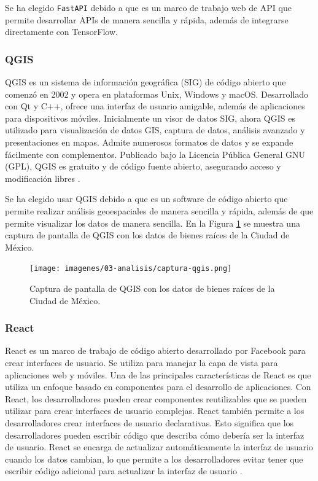 Se ha elegido \texttt{FastAPI} debido a que es un marco de trabajo web de API
que permite desarrollar APIs de manera sencilla y rápida, además de integrarse
directamente con TensorFlow.

\subsubsection{QGIS}
QGIS es un sistema de información geográfica (SIG) de código abierto que comenzó
en 2002 y opera en plataformas Unix, Windows y macOS. Desarrollado con Qt y C++,
ofrece una interfaz de usuario amigable, además de aplicaciones para dispositivos
móviles. Inicialmente un visor de datos SIG, ahora QGIS es utilizado para
visualización de datos GIS, captura de datos, análisis avanzado y presentaciones
en mapas. Admite numerosos formatos de datos y se expande fácilmente con complementos.
Publicado bajo la Licencia Pública General GNU (GPL), QGIS es gratuito y de código
fuente abierto, asegurando acceso y modificación libres \cite{qgis_3.28_user_guide}.

Se ha elegido usar QGIS debido a que es un software de código abierto que permite
realizar análisis geoespaciales de manera sencilla y rápida, además de que permite
visualizar los datos de manera sencilla. En la Figura \ref{fig:qgis} se muestra
una captura de pantalla de QGIS con los datos de bienes raíces de la Ciudad de
México.

\begin{figure}[H]
  \centering
  \texttt{[image: imagenes/03-analisis/captura-qgis.png]}
  \caption{Captura de pantalla de QGIS con los datos de bienes raíces de la Ciudad de México.}
  \label{fig:qgis}
\end{figure}

\subsubsection{React}
React es un marco de trabajo de código abierto desarrollado por Facebook para
crear interfaces de usuario. Se utiliza para manejar la capa de vista para aplicaciones
web y móviles. Una de las principales características de React es que utiliza
un enfoque basado en componentes para el desarrollo de aplicaciones. Con React,
los desarrolladores pueden crear componentes reutilizables que se pueden utilizar
para crear interfaces de usuario complejas. React también permite a los desarrolladores
crear interfaces de usuario declarativas. Esto significa que los desarrolladores
pueden escribir código que describa cómo debería ser la interfaz de usuario.
React se encarga de actualizar automáticamente la interfaz de usuario cuando
los datos cambian, lo que permite a los desarrolladores evitar tener que
escribir código adicional para actualizar la interfaz de usuario \cite{ReactLearn2023}.

